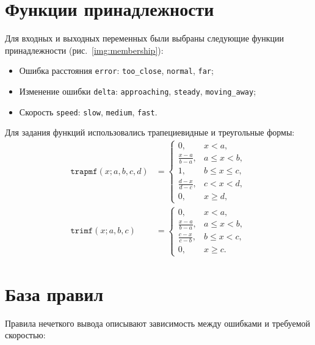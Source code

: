 \section{Функции принадлежности}

Для входных и выходных переменных были выбраны следующие функции принадлежности (рис.~\ref{img:membership}):

\begin{itemize}
    \item Ошибка расстояния \texttt{error}: \texttt{too\_close}, \texttt{normal}, \texttt{far};
    \item Изменение ошибки \texttt{delta}: \texttt{approaching}, \texttt{steady}, \texttt{moving\_away};
    \item Скорость \texttt{speed}: \texttt{slow}, \texttt{medium}, \texttt{fast}.
\end{itemize}

Для задания функций использовались трапециевидные и треугольные формы:
\begin{align*}
\texttt{trapmf}(x; a,b,c,d) &= 
\begin{cases}
0, & x < a,\\
\frac{x-a}{b-a}, & a \le x < b,\\
1, & b \le x \le c,\\
\frac{d-x}{d-c}, & c < x < d,\\
0, & x \ge d,
\end{cases}\\
\texttt{trimf}(x; a,b,c) &= 
\begin{cases}
0, & x < a,\\
\frac{x-a}{b-a}, & a \le x < b,\\
\frac{c-x}{c-b}, & b \le x < c,\\
0, & x \ge c.
\end{cases}
\end{align*}


\section{База правил}

Правила нечеткого вывода описывают зависимость между ошибками и требуемой скоростью:


